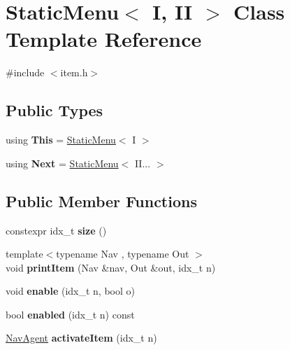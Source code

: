 \hypertarget{classStaticMenu}{}\section{Static\+Menu$<$ I, II $>$ Class Template Reference}
\label{classStaticMenu}


{\ttfamily \#include $<$item.\+h$>$}

\subsection*{Public Types}
\begin{DoxyCompactItemize}
\item 
\mbox{\label{classStaticMenu_af5a92e27a1dc146ef1a6facfb870b245}} 
using {\bfseries This} = \hyperlink{classStaticMenu}{Static\+Menu}$<$ I $>$
\item 
\mbox{\label{classStaticMenu_a85c856832cde6a24cdfff1fa28891017}} 
using {\bfseries Next} = \hyperlink{classStaticMenu}{Static\+Menu}$<$ I\+I... $>$
\end{DoxyCompactItemize}
\subsection*{Public Member Functions}
\begin{DoxyCompactItemize}
\item 
\mbox{\label{classStaticMenu_a7b958c98761a7974d927041f9c659779}} 
constexpr idx\+\_\+t {\bfseries size} ()
\item 
\mbox{\label{classStaticMenu_a0cb879980a1886111d9d6307510ca7c9}} 
{\footnotesize template$<$typename Nav , typename Out $>$ }\\void {\bfseries print\+Item} (Nav \&nav, Out \&out, idx\+\_\+t n)
\item 
\mbox{\label{classStaticMenu_ad92d5faa9b949038b1fbfe77e20a6674}} 
void {\bfseries enable} (idx\+\_\+t n, bool o)
\item 
\mbox{\label{classStaticMenu_ab7a3a6c422252f5d2cc467bed2d36e2c}} 
bool {\bfseries enabled} (idx\+\_\+t n) const
\item 
\mbox{\label{classStaticMenu_a6f5156578dd2e98db3c40c89ed39d95c}} 
\hyperlink{structNavAgent}{Nav\+Agent} {\bfseries activate\+Item} (idx\+\_\+t n)
\end{DoxyCompactItemize}
